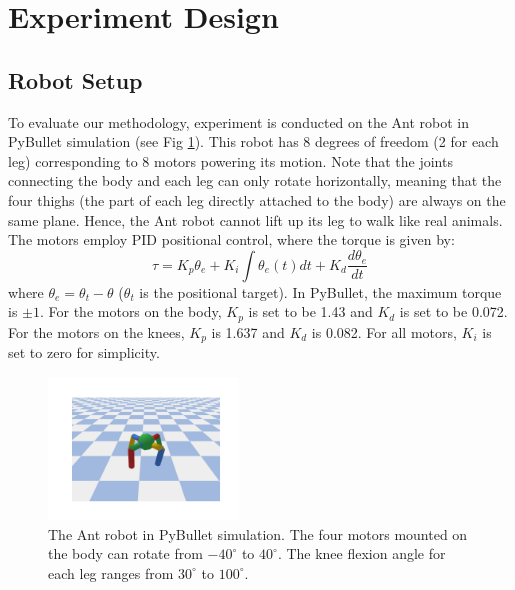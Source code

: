 

\section{Experiment Design}



\subsection{Robot Setup}
To evaluate our methodology, experiment is conducted on the Ant robot in PyBullet simulation \cite{PyBullet} (see Fig \ref{Ant_robot}). 
This robot has 8 degrees of freedom (2 for each leg) corresponding to 8 motors powering its motion.
Note that the joints connecting the body and each leg can only rotate horizontally, meaning that the four thighs (the part of each leg directly attached to the body) are always on the same plane.
Hence, the Ant robot cannot lift up its leg to walk like real animals.
The motors employ PID positional control, where the torque is given by:
\begin{equation}
\tau = K_p \theta_e + K_i \int \theta_e(t) dt + K_d \frac{d \theta_e}{dt}
\label{PID}
\end{equation}
where $\theta_e = \theta_t - \theta$ ($\theta_t$ is the positional target).
In PyBullet, the maximum torque is $\pm 1$. 
For the motors on the body, $K_p$ is set to be 1.43 and $K_d$ is set to be 0.072.
For the motors on the knees, $K_p$ is 1.637 and $K_d$ is 0.082.
For all motors, $K_i$ is set to zero for simplicity. 
\begin{figure}[h]
\centering
\includegraphics[width=0.45\textwidth]{intact_robot.pdf}
\caption{The Ant robot in PyBullet simulation. 
The four motors mounted on the body can rotate from $-40^{\circ}$ to $40^{\circ}$. The knee flexion angle for each leg ranges from 
$30^{\circ}$ to $100^{\circ}$.
}
\label{Ant_robot}
\end{figure}


